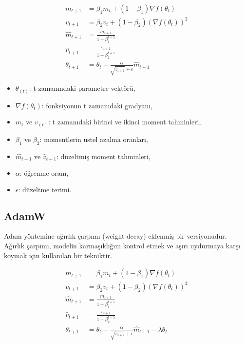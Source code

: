 \begin{align*}
m_{t+1} & = \beta_{1}m_{t} + (1 - \beta_{1})\nabla f(\theta_{t}) \\
v_{t+1} & = \beta_{2}v_{t} + (1 - \beta_{2})(\nabla f(\theta_{t}))^2 \\
\hat{m}_{t+1} & = \frac{m_{t+1}}{1 - \beta_{1}^{t+1}} \\
\hat{v}_{t+1} & = \frac{v_{t+1}}{1 - \beta_{2}^{t+1}} \\
\theta_{t+1} & = \theta_{t} - \frac{\alpha}{\sqrt{\hat{v}_{t+1}} + \epsilon} \hat{m}_{t+1}
\end{align*}

\begin{itemize}
	\item $\theta_(t)$: t zamanındaki parametre vektörü,
	\item $\nabla f(\theta_{t})$: fonksiyonun t zamanıdaki gradyanı,
	\item $m_{t}$ ve $v_(t)$: t zamanıdaki birinci ve ikinci moment tahminleri,
	\item $\beta_{1}$ ve $\beta_{2}$: momentlerin üstel azalma oranları,
	\item $\hat{m}_{t+1}$ ve $\hat{v}_{t+1}$: düzeltmiş moment tahminleri,
	\item $\alpha$: öğrenme oranı,
	\item $\epsilon$: düzeltme terimi.
\end{itemize}

\newpage

\subsection{AdamW}
Adam yöntemine ağırlık çarpımı (weight decay) eklenmiş bir versiyonudur. Ağırlık çarpımı, modelin karmaşıklığını kontrol etmek ve aşırı uydurmaya karşı koymak için kullanılan bir tekniktir.

\begin{align*}
m_{t+1} & = \beta_{1}m_{t} + (1 - \beta_{1})\nabla f(\theta_{t}) \\
v_{t+1} & = \beta_{2}v_{t} + (1 - \beta_{2})(\nabla f(\theta_{t}))^2 \\
\hat{m}_{t+1} & = \frac{m_{t+1}}{1 - \beta_{1}^{t+1}} \\
\hat{v}_{t+1} & = \frac{v_{t+1}}{1 - \beta_{2}^{t+1}} \\
\theta_{t+1} & = \theta_{t} - \frac{\alpha}{\sqrt{\hat{v}_{t+1}} + \epsilon} \hat{m}_{t+1} - \lambda \theta_{t}
\end{align*}

